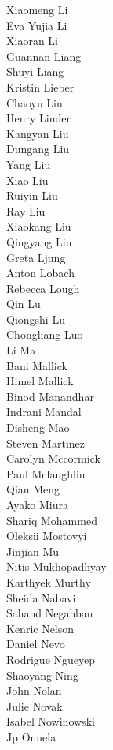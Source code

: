 Xiaomeng Li\\
Eva Yujia Li\\
Xiaoran Li\\
Guannan Liang\\
Shuyi Liang\\
Kristin Lieber\\
Chaoyu Lin\\
Henry Linder\\
Kangyan Liu\\
Dungang Liu\\
Yang Liu\\
Xiao Liu\\
Ruiyin Liu\\
Ray Liu\\
Xiaokang  Liu\\
Qingyang Liu\\
Greta Ljung\\
Anton Lobach\\
Rebecca Lough\\
Qin Lu\\
Qiongshi Lu\\
Chongliang Luo\\
Li Ma\\
Bani Mallick\\
Himel Mallick\\
Binod Manandhar\\
Indrani Mandal\\
Disheng Mao\\
Steven  Martinez\\
Carolyn Mccormick\\
Paul Mclaughlin\\
Qian Meng\\
Ayako Miura\\
Shariq Mohammed\\
Oleksii Mostovyi\\
Jinjian Mu\\
Nitis Mukhopadhyay\\
Karthyek Murthy\\
Sheida Nabavi\\
Sahand Negahban\\
Kenric Nelson\\
Daniel Nevo\\
Rodrigue Ngueyep\\
Shaoyang Ning\\
John Nolan\\
Julie Novak\\
Isabel Nowinowski\\
Jp Onnela\\
